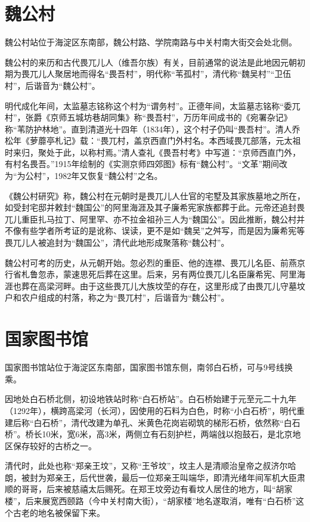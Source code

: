 \section{魏公村}
魏公村站位于海淀区东南部，魏公村路、学院南路与中关村南大街交会处北侧。

魏公村的来历和古代畏兀儿人（维吾尔族）有关，目前通常的说法是此地因元朝初期为畏兀儿人聚居地而得名“畏吾村”，明代称“苇孤村”，清代称“魏吴村”“卫伍村”，后谐音为“魏公村”。

明代成化年间，太监墓志铭称这个村为“谓务村”。正德年间，太监墓志铭称“委兀村”，张爵《京师五城坊巷胡同集》称“畏吾村”，万历年间成书的《宛署杂记》称“苇防护林地”。直到清道光十四年（1834年），这个村子仍叫“畏吾村”。清人乔松年《萝蘼亭札记》载：“畏兀村，盖京西直门外村名。本西域畏兀部落，元太祖时来归，聚处于此，以称村焉。”清人查礼《畏吾村考》中写道：“京师西直门外，有村名畏吾。”1915年绘制的《实测京师四郊图》标有“魏公村”。“文革”期间改为“为公村”，1982年又恢复“魏公村”之名。

《魏公村研究》称，魏公村在元朝时是畏兀儿人仕官的宅墅及其家族墓地之所在，如受封宅邸并敕封“魏国公”的阿里海涯及其子廉希宪家族都葬于此。元帝还追封畏兀儿重臣扎马拉丁、阿里罕、亦不拉金祖孙三人为“魏国公”。因此推断，魏公村并不像有些学者所考证的是讹称、误读，更不是如“魏吴”之舛写，而是因为廉希宪等畏兀儿人被追封为“魏国公”，清代此地形成聚落称“魏公村”。

魏公村可考的历史，从元朝开始。忽必烈的重臣、他的连襟、畏兀儿名臣、前燕京行省札鲁忽赤，蒙速思死后葬在这里。后来，另有两位畏兀儿名臣廉希宪、阿里海涯也葬在高梁河畔。由于这些畏兀儿大族坟茔的存在，这里形成了由畏兀儿守墓坟户和农户组成的村落，称之为“畏兀村”，后谐音为“魏公村”。

\section{国家图书馆}
国家图书馆站位于海淀区东南部，国家图书馆东侧，南邻白石桥，可与9号线换乘。

因地处白石桥北侧，初设地铁站时称“白石桥站”。白石桥始建于元至元二十九年（1292年），横跨高梁河（长河），因使用的石料为白色，时称“小白石桥”，明代重建后称“白石桥”，清代改建为单孔、米黄色花岗岩砌筑的梯形石桥，依然称“白石桥”。桥长10米，宽6米，高3米，两侧立有石刻护栏，两端戗以抱鼓石，是北京地区保存较好的古桥之一。

清代时，此处也称“郑亲王坟”，又称“王爷坟”，坟主人是清顺治皇帝之叔济尔哈朗，被封为郑亲王，后代世袭，最后一位郑亲王叫端华，即清光绪年间军机大臣肃顺的哥哥，后来被慈禧太后赐死。在郑王坟旁边有看坟人居住的地方，叫“胡家楼”，后来展宽西颐路（今中关村南大街），“胡家楼”地名遂取消，唯有“白石桥”这个古老的地名被保留下来。

